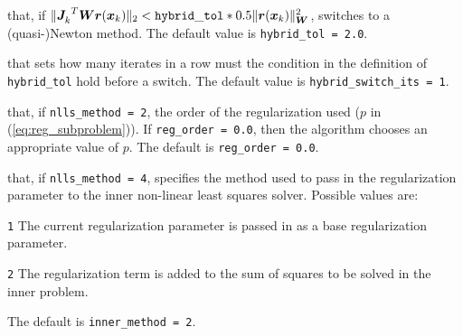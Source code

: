 \begin{description}
that, if \(\|{{\bm J}_{k}^{}}^T {\bm W} {\bm r}({\bm x}_k) \|_2 < \mathtt{hybrid\_tol} * 0.5 \|{\bm r}({\bm x}_k)\|_{\bm W}^2\), switches to a \newline(quasi-)Newton method.
The default value is {\tt hybrid\_tol = 2.0}.

that sets how many iterates in a row must the condition in the definition of {\tt hybrid\_tol} hold before a switch.
The default value is {\tt hybrid\_switch\_its = 1}.

that, if {\tt nlls\_method = 2}, the order of the regularization used ($p$ in (\ref{eq:reg_subproblem})).  If {\tt reg\_order = 0.0}, then the algorithm
chooses an appropriate value of $p$. The default is {\tt reg\_order = 0.0}.

that, if {\tt nlls\_method = 4}, specifies the method used to pass in
the regularization parameter to the inner non-linear least squares solver.
Possible values are:
\begin{description}
  \item {\tt 1} The current regularization parameter is passed in as a base regularization parameter.
  \item {\tt 2} The regularization term is added to the sum of squares to be solved in the inner problem.
\end{description}
The default is {\tt inner\_method = 2}.


\end{description}


